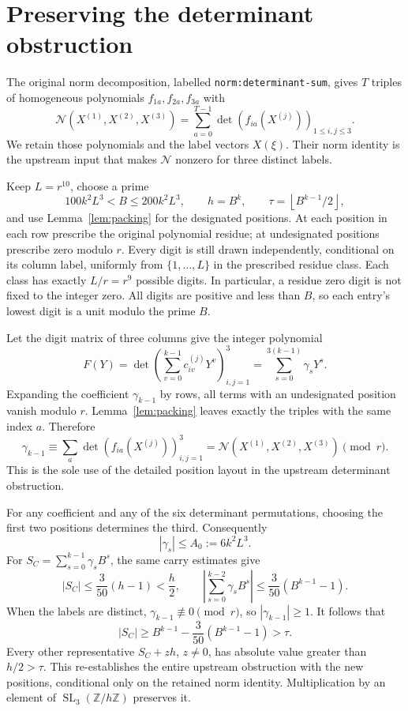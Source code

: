 \documentclass[11pt]{article}
\newcommand{\Z}{\mathbb Z}
\begin{document}
\section{Preserving the determinant obstruction}
The original norm decomposition, labelled
\texttt{norm:determinant-sum}, gives \(T\) triples of homogeneous
polynomials \(f_{1a},f_{2a},f_{3a}\) with
\[
 \mathcal N(X^{(1)},X^{(2)},X^{(3)})
   =\sum_{a=0}^{T-1}\det(f_{ia}(X^{(j)}))_{1\le i,j\le3}.
\]
We retain those polynomials and the label vectors \(X(\xi)\).
Their norm identity is the upstream input that makes \(\mathcal N\)
nonzero for three distinct labels.

Keep \(L=r^{10}\), choose a prime
\[
 100k^2L^3<B\le200k^2L^3,\qquad
 h=B^k,\qquad \tau=\left\lfloor B^{k-1}/2\right\rfloor,
\]
and use Lemma~\ref{lem:packing} for the designated positions.
At each position in each row prescribe the original polynomial residue;
at undesignated positions prescribe zero modulo \(r\).
Every digit is still drawn independently, conditional on its column
label, uniformly from \(\{1,\ldots,L\}\) in the prescribed residue class.
Each class has exactly \(L/r=r^9\) possible digits.
In particular, a residue zero digit is not fixed to the integer zero.
All digits are positive and less than \(B\), so each entry's lowest
digit is a unit modulo the prime \(B\).

Let the digit matrix of three columns give the integer polynomial
\[
 F(Y)=\det\left(\sum_{v=0}^{k-1}c_{iv}^{(j)}Y^v\right)_{i,j=1}^3
     =\sum_{s=0}^{3(k-1)}\gamma_sY^s.
\]
Expanding the coefficient \(\gamma_{k-1}\) by rows, all terms with
an undesignated position vanish modulo \(r\).
Lemma~\ref{lem:packing} leaves exactly the triples with the same
index \(a\). Therefore
\[
 \gamma_{k-1}\equiv
 \sum_a\det(f_{ia}(X^{(j)}))_{i,j=1}^3
 =\mathcal N(X^{(1)},X^{(2)},X^{(3)})\pmod r.
\]
This is the sole use of the detailed position layout in the upstream
determinant obstruction.

For any coefficient and any of the six determinant permutations,
choosing the first two positions determines the third. Consequently
\[
 |\gamma_s|\le A_0:=6k^2L^3.
\]
For \(S_C=\sum_{s=0}^{k-1}\gamma_sB^s\), the same carry estimates give
\[
 |S_C|\le\frac{3}{50}(h-1)<\frac h2,\qquad
 \left|\sum_{s=0}^{k-2}\gamma_sB^s\right|
     \le\frac{3}{50}(B^{k-1}-1).
\]
When the labels are distinct, \(\gamma_{k-1}\not\equiv0\pmod r\),
so \(|\gamma_{k-1}|\ge1\). It follows that
\[
 |S_C|\ge B^{k-1}-\frac{3}{50}(B^{k-1}-1)>\tau.
\]
Every other representative \(S_C+zh\), \(z\ne0\), has absolute
value greater than \(h/2>\tau\). This re-establishes the entire
upstream obstruction with the new positions, conditional only on
the retained norm identity. Multiplication by an element of
\(\operatorname{SL}_3(\Z/h\Z)\) preserves it.
\end{document}
